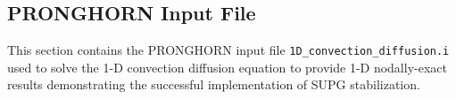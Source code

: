 \documentclass[10pt]{article}
\numberwithin{equation}{section} %
\begin{document}
\subsection{PRONGHORN Input File}
\label{sec:Input}

This section contains the PRONGHORN input file \texttt{1D\_convection\_diffusion.i} used to solve the 1-D convection diffusion equation to provide 1-D nodally-exact results demonstrating the successful implementation of SUPG stabilization. 


\end{document}
